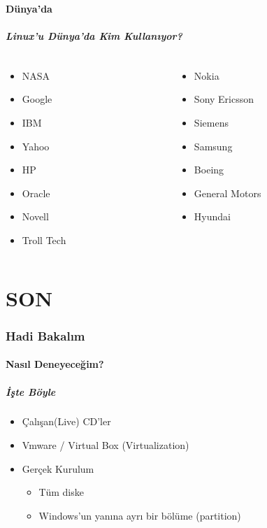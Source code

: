 \documentclass{beamer}
\begin{document}
	\subsection{Dünya'da}
		\begin{frame}
		 	\frametitle{Linux'u Dünya'da Kim Kullanıyor?}
			\begin{columns}
			\begin{column}[l]{5cm}
				\begin{itemize}
					\item NASA
					\item Google
					\item IBM
					\item Yahoo
					\item HP
					\item Oracle
					\item Novell
					\item Troll Tech
				\end{itemize}
			\end{column}
			\begin{column}[r]{5cm}
				\begin{itemize}
					\item Nokia
					\item Sony Ericsson
					\item Siemens
					\item Samsung
					\item Boeing
					\item General Motors
					\item Hyundai	
				\end{itemize}
			\end{column}
			\end{columns}

		\end{frame}
\part{SON}
\section {Hadi Bakalım}
	
	\subsection{Nasıl Deneyeceğim?}
	\begin{frame}
		\frametitle{İşte Böyle}
			\begin{itemize}[<+->]
			\item Çalışan(Live) CD'ler
			\item Vmware / Virtual Box (Virtualization)
			\item Gerçek Kurulum
			\begin{itemize}
 				\item Tüm diske
				\item Windows'un yanına ayrı bir bölüme (partition)
			\end{itemize}

			\end{itemize}
	\end{frame}
\end{document}
